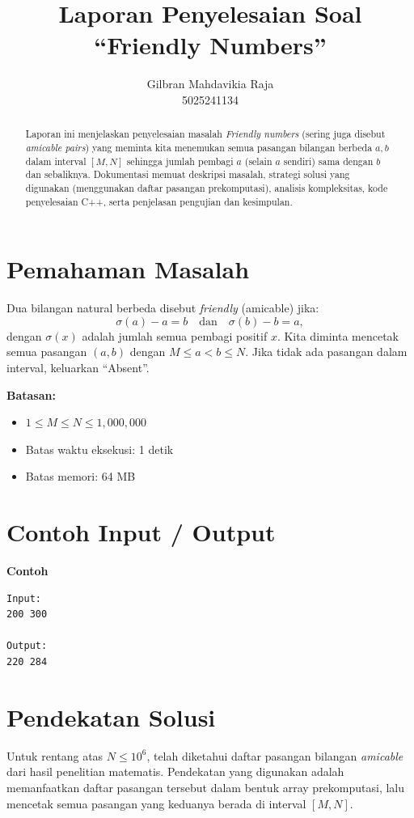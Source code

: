 \documentclass[12pt,a4paper]{article}
\title{Laporan Penyelesaian Soal ``Friendly Numbers''}
\author{Gilbran Mahdavikia Raja \\ 5025241134}
\begin{document}
\maketitle

\begin{abstract}
Laporan ini menjelaskan penyelesaian masalah \emph{Friendly numbers} (sering juga disebut \emph{amicable pairs}) yang meminta kita menemukan semua pasangan bilangan berbeda \(a, b\) dalam interval \([M, N]\) sehingga jumlah pembagi \(a\) (selain \(a\) sendiri) sama dengan \(b\) dan sebaliknya. Dokumentasi memuat deskripsi masalah, strategi solusi yang digunakan (menggunakan daftar pasangan prekomputasi), analisis kompleksitas, kode penyelesaian C++, serta penjelasan pengujian dan kesimpulan.
\end{abstract}

\section{Pemahaman Masalah}
Dua bilangan natural berbeda disebut \emph{friendly} (amicable) jika:
\[
\sigma(a) - a = b \quad\text{dan}\quad \sigma(b) - b = a,
\]
dengan \(\sigma(x)\) adalah jumlah semua pembagi positif \(x\). Kita diminta mencetak semua pasangan \((a, b)\) dengan \(M \le a < b \le N\). Jika tidak ada pasangan dalam interval, keluarkan ``Absent''.

\noindent
\textbf{Batasan:}
\begin{itemize}
  \item \(1 \le M \le N \le 1{,}000{,}000\)
  \item Batas waktu eksekusi: 1 detik
  \item Batas memori: 64 MB
\end{itemize}

\section{Contoh Input / Output}
\textbf{Contoh}
\begin{verbatim}
Input:
200 300

Output:
220 284
\end{verbatim}

\section{Pendekatan Solusi}
Untuk rentang atas \(N \le 10^6\), telah diketahui daftar pasangan bilangan \emph{amicable} dari hasil penelitian matematis. Pendekatan yang digunakan adalah memanfaatkan daftar pasangan tersebut dalam bentuk array prekomputasi, lalu mencetak semua pasangan yang keduanya berada di interval \([M, N]\).
\end{document}
